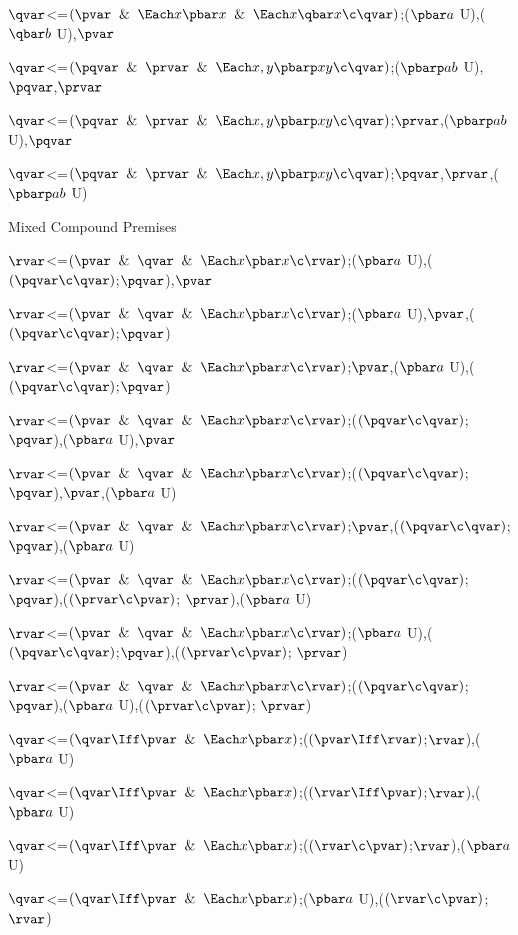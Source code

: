 $\qvar$<=$(\pvar \And \Each x \pbar x \And \Each x \qbar x \c \qvar)$;($\pbar a$ U),($\qbar b$ U),$\pvar$

$\qvar$<=$(\pqvar \And \prvar \And \Each x,y \pbarp xy\c \qvar)$;($\pbarp ab$ U),$\pqvar$,$\prvar$

$\qvar$<=$(\pqvar \And \prvar \And \Each x,y \pbarp xy\c \qvar)$;$\prvar$,($\pbarp ab$ U),$\pqvar$

$\qvar$<=$(\pqvar \And \prvar \And \Each x,y \pbarp xy\c \qvar)$;$\pqvar$,$\prvar$,($\pbarp ab$ U)
\lineb

Mixed Compound Premises
\lineb

$\rvar$<=$(\pvar \And \qvar \And \Each x \pbar x \c \rvar)$;($\pbar a$ U),($(\pqvar \c \qvar)$;$\pqvar$),$\pvar$

$\rvar$<=$(\pvar \And \qvar \And \Each x \pbar x \c \rvar)$;($\pbar a$ U),$\pvar$,($(\pqvar \c \qvar)$;$\pqvar$)

$\rvar$<=$(\pvar \And \qvar \And \Each x \pbar x \c \rvar)$;$\pvar$,($\pbar a$ U),($(\pqvar \c \qvar)$;$\pqvar$)

$\rvar$<=$(\pvar \And \qvar \And \Each x \pbar x \c \rvar)$;($(\pqvar \c \qvar)$;$\pqvar$),($\pbar a$ U),$\pvar$

$\rvar$<=$(\pvar \And \qvar \And \Each x \pbar x \c \rvar)$;($(\pqvar \c \qvar)$;$\pqvar$),$\pvar$,($\pbar a$ U)

$\rvar$<=$(\pvar \And \qvar \And \Each x \pbar x \c \rvar)$;$\pvar$,($(\pqvar \c \qvar)$;$\pqvar$),($\pbar a$ U)

$\rvar$<=$(\pvar \And \qvar \And \Each x \pbar x \c \rvar)$;($(\pqvar \c \qvar)$;$\pqvar$),($(\prvar \c \pvar)$; $\prvar$),($\pbar a$ U)

$\rvar$<=$(\pvar \And \qvar \And \Each x \pbar x \c \rvar)$;($\pbar a$ U),($(\pqvar \c \qvar)$;$\pqvar$),($(\prvar \c \pvar)$; $\prvar$)

$\rvar$<=$(\pvar \And \qvar \And \Each x \pbar x \c \rvar)$;($(\pqvar \c \qvar)$;$\pqvar$),($\pbar a$ U),($(\prvar \c \pvar)$; $\prvar$)

$\qvar$<=$(\qvar \Iff \pvar \And \Each x \pbar x)$;($(\pvar \Iff \rvar)$;$\rvar$),($\pbar a$ U)

$\qvar$<=$(\qvar \Iff \pvar \And \Each x \pbar x)$;($(\rvar \Iff \pvar)$;$\rvar$),($\pbar a$ U)

$\qvar$<=$(\qvar \Iff \pvar \And \Each x \pbar x)$;($(\rvar \c \pvar)$;$\rvar$),($\pbar a$ U)

$\qvar$<=$(\qvar \Iff \pvar \And \Each x \pbar x)$;($\pbar a$ U),($(\rvar \c \pvar)$;$\rvar$)

